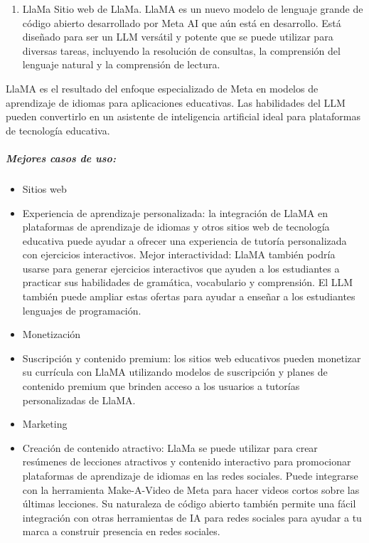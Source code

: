 \documentclass[a4paper12pt]{article}
\providecommand{\tightlist}{%
      \setlength{\itemsep}{0pt}\setlength{\parskip}{0pt}}
\begin{document}
\begin{enumerate}
\def\labelenumi{\arabic{enumi}.}
\setcounter{enumi}{3}
\tightlist
\item
  LlaMa Sitio web de LlaMa. LlaMA es un nuevo modelo de lenguaje grande
  de código abierto desarrollado por Meta AI que aún está en desarrollo.
  Está diseñado para ser un LLM versátil y potente que se puede utilizar
  para diversas tareas, incluyendo la resolución de consultas, la
  comprensión del lenguaje natural y la comprensión de lectura.
\end{enumerate}

LlaMA es el resultado del enfoque especializado de Meta en modelos de
aprendizaje de idiomas para aplicaciones educativas. Las habilidades del
LLM pueden convertirlo en un asistente de inteligencia artificial ideal
para plataformas de tecnología educativa.

\hypertarget{mejores-casos-de-uso-3}{%
\subparagraph{Mejores casos de uso:}\label{mejores-casos-de-uso-3}}

\begin{itemize}
\item
  Sitios web
\item
  Experiencia de aprendizaje personalizada: la integración de LlaMA en
  plataformas de aprendizaje de idiomas y otros sitios web de tecnología
  educativa puede ayudar a ofrecer una experiencia de tutoría
  personalizada con ejercicios interactivos. Mejor interactividad: LlaMA
  también podría usarse para generar ejercicios interactivos que ayuden
  a los estudiantes a practicar sus habilidades de gramática,
  vocabulario y comprensión. El LLM también puede ampliar estas ofertas
  para ayudar a enseñar a los estudiantes lenguajes de programación.
\item
  Monetización
\item
  Suscripción y contenido premium: los sitios web educativos pueden
  monetizar su currícula con LlaMA utilizando modelos de suscripción y
  planes de contenido premium que brinden acceso a los usuarios a
  tutorías personalizadas de LlaMA.
\item
  Marketing
\item
  Creación de contenido atractivo: LlaMa se puede utilizar para crear
  resúmenes de lecciones atractivos y contenido interactivo para
  promocionar plataformas de aprendizaje de idiomas en las redes
  sociales. Puede integrarse con la herramienta Make-A-Video de Meta
  para hacer videos cortos sobre las últimas lecciones. Su naturaleza de
  código abierto también permite una fácil integración con otras
  herramientas de IA para redes sociales para ayudar a tu marca a
  construir presencia en redes sociales.
\end{itemize}
\end{document}
